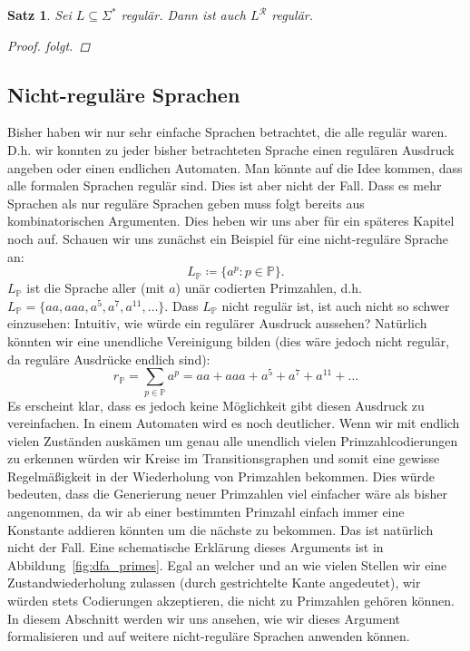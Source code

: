 \documentclass[11pt, a4paper]{article}
\theoremstyle{definition}
\theoremstyle{plain}
\newtheorem{theorem}[definition]{Satz}
\numberwithin{equation}{section}
\begin{document}
\begin{theorem}
	Sei \( L \subseteq \Sigma^\ast \) regulär. Dann ist auch \( L^\mathcal{R} \) regulär.
	\begin{proof}
		folgt. %
	\end{proof}
\end{theorem}


\subsection{Nicht-reguläre Sprachen}\label{sec:regular_nonregular}
Bisher haben wir nur sehr einfache Sprachen betrachtet, die alle regulär waren. D.h. wir konnten zu jeder bisher betrachteten Sprache einen regulären Ausdruck angeben oder einen endlichen Automaten. Man könnte auf die Idee kommen, dass alle formalen Sprachen regulär sind. Dies ist aber nicht der Fall. Dass es mehr Sprachen als nur reguläre Sprachen geben muss folgt bereits aus kombinatorischen Argumenten. Dies heben wir uns aber für ein späteres Kapitel noch auf. Schauen wir uns zunächst ein Beispiel für eine nicht-reguläre Sprache an:
\[
	L_\mathbb{P} \coloneqq \{ a^p : p \in \mathbb{P} \}.
\]
\( L_\mathbb{P} \) ist die Sprache aller (mit \( a \)) unär codierten Primzahlen, d.h. \( L_\mathbb{P} = \{ aa, aaa, a^5, a^7, a^{11}, \ldots \} \). Dass \( L_\mathbb{P} \) nicht regulär ist, ist auch nicht so schwer einzusehen: Intuitiv, wie würde ein regulärer Ausdruck aussehen? Natürlich könnten wir eine unendliche Vereinigung bilden (dies wäre jedoch nicht regulär, da reguläre Ausdrücke endlich sind):
\[
	r_\mathbb{P} = \sum_{p \in \mathbb{P}} a^p = aa + aaa + a^5 + a^7 + a^{11} + \ldots
\]
Es erscheint klar, dass es jedoch keine Möglichkeit gibt diesen Ausdruck zu vereinfachen. In einem Automaten wird es noch deutlicher. Wenn wir mit endlich vielen Zuständen auskämen um genau alle unendlich vielen Primzahlcodierungen zu erkennen würden wir Kreise im Transitionsgraphen und somit eine gewisse Regelmäßigkeit in der Wiederholung von Primzahlen bekommen. Dies würde bedeuten, dass die Generierung neuer Primzahlen viel einfacher wäre als bisher angenommen, da wir ab einer bestimmten Primzahl einfach immer eine Konstante addieren könnten um die nächste zu bekommen. Das ist natürlich nicht der Fall. Eine schematische Erklärung dieses Arguments ist in Abbildung~\ref{fig:dfa_primes}. Egal an welcher und an wie vielen Stellen wir eine Zustandwiederholung zulassen (durch gestrichtelte Kante angedeutet), wir würden stets Codierungen akzeptieren, die nicht zu Primzahlen gehören können. In diesem Abschnitt werden wir uns ansehen, wie wir dieses Argument formalisieren und auf weitere nicht-reguläre Sprachen anwenden können.
\end{document}
